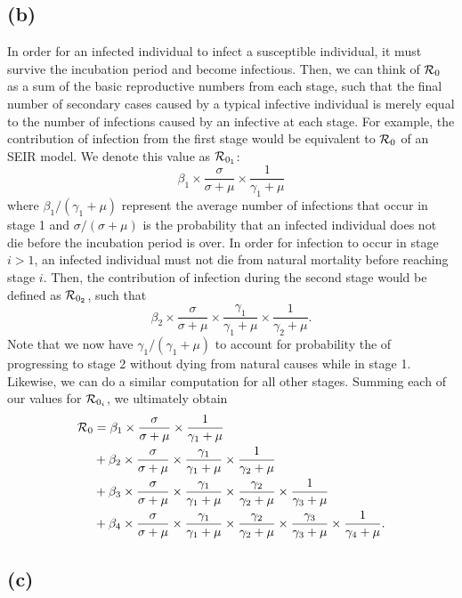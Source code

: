 \documentclass{article}
\begin{document}
\subsection*{(b)}

In order for an infected individual to infect a susceptible individual, it must survive the incubation period and become infectious. 
Then, we can think of ${\cal R}_0$ as a sum of the basic reproductive numbers from each stage, such that the final number of secondary cases caused by a typical infective individual is merely equal to the number of infections caused by an infective at each stage. For example, the contribution of infection from the first stage would be equivalent to ${\cal R}_0$ of an SEIR model. We denote this value as ${\cal R}_{0_1}$:
$$
\beta_1 \times \frac{\sigma}{\sigma + \mu} \times \frac{1}{\gamma_1 + \mu}
$$
where $\beta_1/(\gamma_1 + \mu)$ represent the average number of infections that occur in stage 1 and $\sigma/(\sigma+\mu)$ is the probability that an infected individual does not die before the incubation period is over.
In order for infection to occur in stage $i>1$, an infected individual must not die from natural mortality before reaching stage $i$. Then, the contribution of infection during the second stage would be defined as ${\cal R}_{0_2}$, such that
$$
\beta_2 \times \frac{\sigma}{\sigma + \mu} \times \frac{\gamma_1}{\gamma_1 + \mu} \times \frac{1}{\gamma_2 + \mu}.
$$
Note that we now have $\gamma_1/(\gamma_1+\mu)$ to account for probability the of progressing to stage 2 without dying from natural causes while in stage 1.
Likewise, we can do a similar computation for all other stages. Summing each of our values for ${\cal R}_{0_i}$, we ultimately obtain
$$
\begin{aligned}
{\cal R}_0 &= \beta_1 \times \frac{\sigma}{\sigma + \mu} \times \frac{1}{\gamma_1 + \mu}\\
&+ \beta_2 \times \frac{\sigma}{\sigma + \mu} \times \frac{\gamma_1}{\gamma_1 + \mu} \times \frac{1}{\gamma_2 + \mu}\\
&+ \beta_3 \times \frac{\sigma}{\sigma + \mu} \times \frac{\gamma_1}{\gamma_1 + \mu} \times \frac{\gamma_2}{\gamma_2 + \mu} \times \frac{1}{\gamma_3 + \mu}\\
&+ \beta_4 \times \frac{\sigma}{\sigma + \mu} \times \frac{\gamma_1}{\gamma_1 + \mu} \times \frac{\gamma_2}{\gamma_2 + \mu} \times \frac{\gamma_3}{\gamma_3 + \mu} \times \frac{1}{\gamma_4 + \mu}.
\end{aligned}
$$

\subsection*{(c)}
\end{document}
